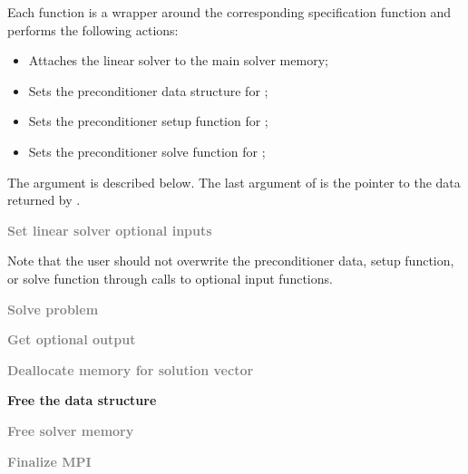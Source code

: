 \begin{Steps}
  Each function  is a wrapper around the corresponding specification
  function  and performs the following actions:
  \begin{itemize}
    \item Attaches the {\kinspils} linear solver to the main {\kinsol} solver memory;
    \item Sets the preconditioner data structure for {\kinbbdpre};
    \item Sets the preconditioner setup function for {\kinbbdpre};
    \item Sets the preconditioner solve function for {\kinbbdpre};
  \end{itemize}
  The argument  is described below.
  The last argument of  is the pointer to the {\kinbbdpre} data
  returned by .

\item
  \textcolor{gray}{\bf Set linear solver optional inputs}

  Note that the user should not overwrite the preconditioner data, setup function,
  or solve function through calls to {\kinspils} optional input functions.

\item
  \textcolor{gray}{\bf Solve problem}

\item
  \textcolor{gray}{\bf Get optional output}

\item
  \textcolor{gray}{\bf Deallocate memory for solution vector}

\item \label{i:bbdpre_free}
  {\bf Free the {\kinbbdpre} data structure}


\item
  \textcolor{gray}{\bf Free solver memory}
  
\item 
  \textcolor{gray}{\bf Finalize MPI}

\end{Steps}

